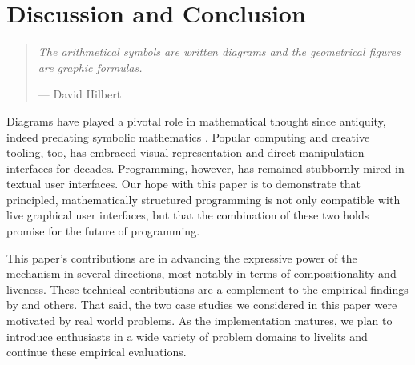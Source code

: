 \section{Discussion and Conclusion}\label{sec:discussion}\label{sec:conclusion}
\begin{quote}
  \textit{
  The arithmetical symbols are written diagrams and the geometrical figures are graphic formulas.\vspace{3px}
  }
  
  \hfill{}--- David Hilbert~\cite{hilbert1902mathematical}
  \end{quote}

  \noindent
  Diagrams have played a pivotal role in mathematical thought since antiquity,
  indeed predating symbolic mathematics \cite{cajori1993history}. 
  Popular computing and creative tooling, too, has embraced visual representation and direct manipulation 
  interfaces for decades.
  Programming, however, has remained stubbornly mired in textual user interfaces. 
  Our hope with this paper is to demonstrate that principled, mathematically structured
  programming is not only compatible with live graphical user interfaces, but that the 
  combination of these two holds promise for the future of programming.

  This paper's contributions are 
  in advancing the expressive power of the mechanism in several directions, 
  most notably in terms of compositionality and liveness. These 
  technical contributions are a complement to the empirical findings by \citet{Graphite} and others.
  That said, the two case studies we considered in this paper were motivated by 
  real world problems. 
  As the implementation
  matures, we plan to introduce enthusiasts in a wide variety of problem domains
  to livelits and continue these empirical evaluations.



